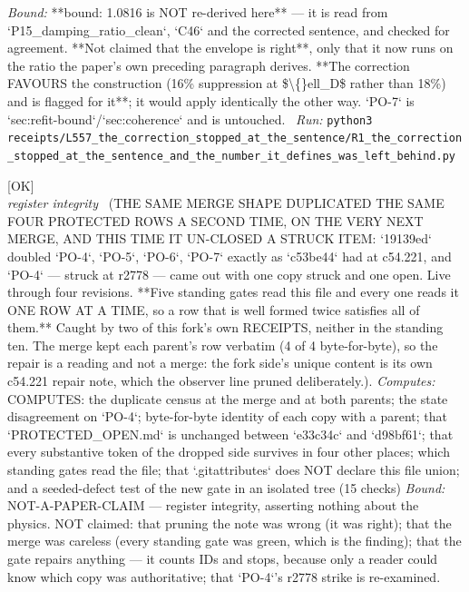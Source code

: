 \begin{description}
 \emph{Bound:} **bound: 1.0816 is NOT re-derived here** --- it is read from `P15\_damping\_ratio\_clean`, `C46` and the corrected sentence, and checked for agreement. **Not claimed that the envelope is right**, only that it now runs on the ratio the paper's own preceding paragraph derives.  **The correction FAVOURS the construction (16\% suppression at \$\textbackslash\{\}ell\_D\$ rather than 18\%) and is flagged for it**; it would apply identically the other way. `PO-7` is `sec:refit-bound`/`sec:coherence` and is untouched.
\ \emph{Run:} \texttt{python3 receipts/L557\_the\_correction\_stopped\_at\_the\_sentence/R1\_the\_correction\_stopped\_at\_the\_sentence\_and\_the\_number\_it\_defines\_was\_left\_behind.py}
\item[\label{rcpt:D1_the_same_four_rows_the_second_merge_running_and_this_time_it_unclosed_a_struck_item}\texttt{D1\_the\_same\_four\_rows\_the\_second\_merge\_running\_and\_this\_time\_it\_unclosed\_a\_struck\_item}]\hfill\textsf{[OK]}\\
\textit{register integrity} \ (THE SAME MERGE SHAPE DUPLICATED THE SAME FOUR PROTECTED ROWS A SECOND TIME, ON THE VERY NEXT MERGE, AND THIS TIME IT UN-CLOSED A STRUCK ITEM: `19139ed` doubled `PO-4`, `PO-5`, `PO-6`, `PO-7` exactly as `c53be44` had at c54.221, and `PO-4` --- struck at r2778 --- came out with one copy struck and one open. Live through four revisions. **Five standing gates read this file and every one reads it ONE ROW AT A TIME, so a row that is well formed twice satisfies all of them.** Caught by two of this fork's own RECEIPTS, neither in the standing ten. The merge kept each parent's row verbatim (4 of 4 byte-for-byte), so the repair is a reading and not a merge: the fork side's unique content is its own c54.221 repair note, which the observer line pruned deliberately.). 
\emph{Computes:} COMPUTES: the duplicate census at the merge and at both parents; the state disagreement on `PO-4`; byte-for-byte identity of each copy with a parent; that `PROTECTED\_OPEN.md` is unchanged between `e33c34c` and `d98bf61`; that every substantive token of the dropped side survives in four other places; which standing gates read the file; that `.gitattributes` does NOT declare this file union; and a seeded-defect test of the new gate in an isolated tree (15 checks)
 \emph{Bound:} NOT-A-PAPER-CLAIM --- register integrity, asserting nothing about the physics. NOT claimed: that pruning the note was wrong (it was right); that the merge was careless (every standing gate was green, which is the finding); that the gate repairs anything --- it counts IDs and stops, because only a reader could know which copy was authoritative; that `PO-4`'s r2778 strike is re-examined.

\end{description}
